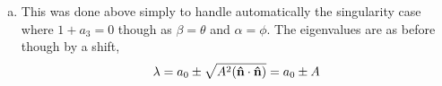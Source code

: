 \documentclass[10pt]{scrartcl}
\begin{document}
\begin{enumerate}[(a)]
\begin{align*}
&= \frac{1}{\sqrt{2}}\qty(\sqrt{1\pm a_3}, \pm\sqrt{1\mp a_3}\cdot(a_1 + i a_2))\\
&= \frac{1}{\sqrt{2}}\qty(\sqrt{1\pm a_3}, \pm\sqrt{1\mp a_3}\exp{i\alpha})
\end{align*}
Further, from the eigenvalue condition we have that $a_3=\pm (1 + \sqrt{a_1^2 + a_2^2})$ or equivalently $a_1^2 + a_2^2 = (1-a_3^2)\cos^2{\beta} + (1-a_3^2)\sin^2{\beta}$ giving 
\[\ket{H;+}=\mqty(\cos{(\beta/2)}\\ \sin{(\beta/2)}\cdot\exp{i\alpha}),\quad \ket{H;-}=\mqty(\sin{(\beta/2)}\\-\cos{(\beta/2)}\cdot\exp{i\alpha})\]
Clearly these are orthogonal and stated both in terms of $a_k$ as well as angles to the axes.
\item This was done above simply to handle automatically the singularity case where $1+a_3=0$ though as $\beta=\theta$ and $\alpha =\phi$. 
The eigenvalues are as before though by a shift,
\[\lambda = a_0 \pm \sqrt{A^2(\vu{n}\cdot\vu{n})} = a_0 \pm A\]
\end{enumerate}
\end{document}
